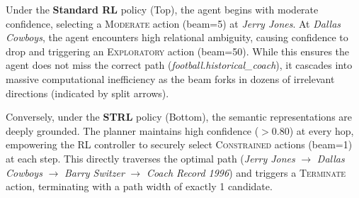 \documentclass[10pt,conference]{IEEEtran}
\begin{document}
Under the \textbf{Standard RL} policy (Top), the agent begins with moderate confidence, selecting a \textsc{Moderate} action (beam=5) at \textit{Jerry Jones}. At \textit{Dallas Cowboys}, the agent encounters high relational ambiguity, causing confidence to drop and triggering an \textsc{Exploratory} action (beam=50). While this ensures the agent does not miss the correct path (\textit{football.historical\_coach}), it cascades into massive computational inefficiency as the beam forks in dozens of irrelevant directions (indicated by split arrows).

Conversely, under the \textbf{STRL} policy (Bottom), the semantic representations are deeply grounded. The planner maintains high confidence ($>0.80$) at every hop, empowering the RL controller to securely select \textsc{Constrained} actions (beam=1) at each step. This directly traverses the optimal path (\textit{Jerry Jones} $\rightarrow$ \textit{Dallas Cowboys} $\rightarrow$ \textit{Barry Switzer} $\rightarrow$ \textit{Coach Record 1996}) and triggers a \textsc{Terminate} action, terminating with a path width of exactly 1 candidate.



\end{document}
